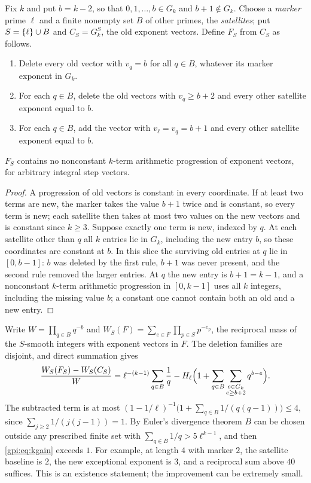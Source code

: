 Fix $k$ and put $b=k-2$, so that $0,1,\dots,b\in G_k$ and $b+1\notin G_k$. Choose a \emph{marker}
prime $\ell$ and a finite nonempty set $B$ of other primes, the \emph{satellites}; put
$S=\{\ell\}\cup B$ and $C_S=G_k^{S}$, the old exponent vectors. Define $F_S$ from $C_S$ as follows.
\begin{enumerate}[label=\textup{(\arabic*)}]
\item Delete every old vector with $v_q=b$ for all $q\in B$, whatever its marker exponent in $G_k$.
\item For each $q\in B$, delete the old vectors with $v_q\ge b+2$ and every other satellite exponent
 equal to $b$.
\item For each $q\in B$, add the vector with $v_\ell=v_q=b+1$ and every other satellite exponent
 equal to $b$.
\end{enumerate}

\begin{lemma}\label{gpi:lem:kavoid}
$F_S$ contains no nonconstant $k$-term arithmetic progression of exponent vectors, for arbitrary
integral step vectors.
\end{lemma}
\begin{proof}
A progression of old vectors is constant in every coordinate. If at least two terms are new, the
marker takes the value $b+1$ twice and is constant, so every term is new; each satellite then takes
at most two values on the new vectors and is constant since $k\ge3$. Suppose exactly one term is
new, indexed by $q$. At each satellite other than $q$ all $k$ entries lie in $G_k$, including the new
entry $b$, so these coordinates are constant at $b$. In this slice the surviving old entries at $q$
lie in $[0,b-1]$: $b$ was deleted by the first rule, $b+1$ was never present, and the second rule
removed the larger entries. At $q$ the new entry is $b+1=k-1$, and a nonconstant $k$-term
arithmetic progression in $[0,k-1]$ uses all $k$ integers, including the missing value $b$; a
constant one cannot contain both an old and a new entry.
\end{proof}

Write $W=\prod_{q\in B}q^{-b}$ and $W_S(F)=\sum_{e\in F}\prod_{p\in S}p^{-e_p}$, the reciprocal mass of
the $S$-smooth integers with exponent vectors in $F$. The deletion families are disjoint, and
direct summation gives
\begin{equation}\label{gpi:eq:kgain}
 \frac{W_S(F_S)-W_S(C_S)}W=\ell^{-(k-1)}\sum_{q\in B}\frac1q
 -H_\ell\Bigl(1+\sum_{q\in B}\sum_{\substack{e\in G_k\\e\ge b+2}}q^{b-e}\Bigr).
\end{equation}
The subtracted term is at most
$(1-1/\ell)^{-1}\bigl(1+\sum_{q\in B}1/(q(q-1))\bigr)\le4$, since
$\sum_{j\ge2}1/(j(j-1))=1$. By Euler's divergence theorem $B$ can be chosen outside any prescribed
finite set with $\sum_{q\in B}1/q>5\ell^{k-1}$, and then \eqref{gpi:eq:kgain} exceeds $1$. For
example, at length $4$ with marker $2$, the satellite baseline is $2$, the new exceptional exponent
is $3$, and a reciprocal sum above $40$ suffices. This is an existence statement; the improvement
can be extremely small.

